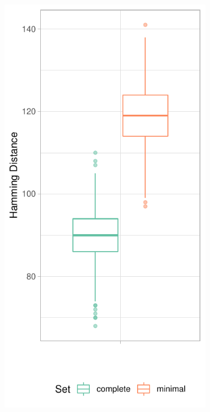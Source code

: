 \documentclass[../../master.tex]{subfiles}
\begin{document}
\begin{figure}[!ht]
	\centering
	\begin{subfigure}[t]{0.2\textwidth}
		\centering
		\includegraphics[width=\textwidth]{pic/results/designs/boxplots/const-hamming-boxplot.pdf}

\end{subfigure}
\end{figure}
\end{document}
